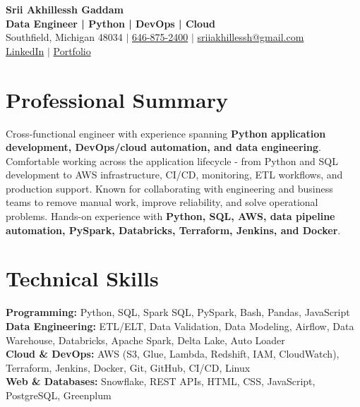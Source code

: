 \documentclass[letterpaper,10pt]{article}
\begin{document}
\fontsize{9.35pt}{10.45pt}\selectfont

\begin{center}
    {\LARGE \textbf{Srii Akhillessh Gaddam}} \\[-1pt]
    \textbf{Data Engineer | Python | DevOps | Cloud} \\[2pt]
    Southfield, Michigan 48034 $|$
    \href{tel:6468752400}{646-875-2400} $|$
    \href{mailto:sriiakhillessh@gmail.com}{sriiakhillessh@gmail.com} \\[1pt]
    \href{https://www.linkedin.com/in/srii-akhiilessh-gaddam-b48668191/}{LinkedIn} $|$
    \href{https://sriiakhillesshg.github.io/portfolio/}{Portfolio}
\end{center}
\vspace{-8pt}

\section{Professional Summary}
\small{Cross-functional engineer with experience spanning \textbf{Python application development, DevOps/cloud automation, and data engineering}. Comfortable working across the application lifecycle - from Python and SQL development to AWS infrastructure, CI/CD, monitoring, ETL workflows, and production support. Known for collaborating with engineering and business teams to remove manual work, improve reliability, and solve operational problems. Hands-on experience with \textbf{Python, SQL, AWS, data pipeline automation, PySpark, Databricks, Terraform, Jenkins, and Docker}.}

\section{Technical Skills}
\small{
\textbf{Programming:} Python, SQL, Spark SQL, PySpark, Bash, Pandas, JavaScript \\
\textbf{Data Engineering:} ETL/ELT, Data Validation, Data Modeling, Airflow, Data Warehouse, Databricks, Apache Spark, Delta Lake, Auto Loader \\
\textbf{Cloud \& DevOps:} AWS (S3, Glue, Lambda, Redshift, IAM, CloudWatch), Terraform, Jenkins, Docker, Git, GitHub, CI/CD, Linux \\
\textbf{Web \& Databases:} Snowflake, REST APIs, HTML, CSS, JavaScript, PostgreSQL, Greenplum
}
\end{document}
